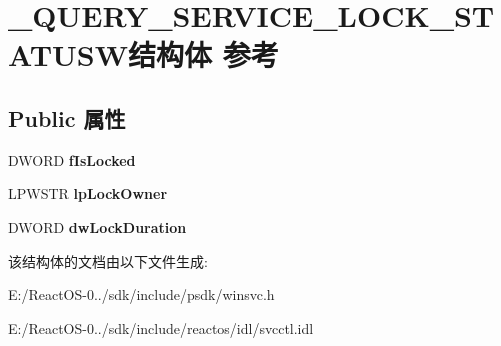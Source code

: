 \hypertarget{struct___q_u_e_r_y___s_e_r_v_i_c_e___l_o_c_k___s_t_a_t_u_s_w}{}\section{\+\_\+\+Q\+U\+E\+R\+Y\+\_\+\+S\+E\+R\+V\+I\+C\+E\+\_\+\+L\+O\+C\+K\+\_\+\+S\+T\+A\+T\+U\+S\+W结构体 参考}
\label{struct___q_u_e_r_y___s_e_r_v_i_c_e___l_o_c_k___s_t_a_t_u_s_w}
\subsection*{Public 属性}
\begin{DoxyCompactItemize}
\item 
\mbox{\label{struct___q_u_e_r_y___s_e_r_v_i_c_e___l_o_c_k___s_t_a_t_u_s_w_aeb8f49d02e77ea3d62c9d1a35a7f58eb}} 
D\+W\+O\+RD {\bfseries f\+Is\+Locked}
\item 
\mbox{\label{struct___q_u_e_r_y___s_e_r_v_i_c_e___l_o_c_k___s_t_a_t_u_s_w_a632a9c186425f62cc1121ed6fd16b89d}} 
L\+P\+W\+S\+TR {\bfseries lp\+Lock\+Owner}
\item 
\mbox{\label{struct___q_u_e_r_y___s_e_r_v_i_c_e___l_o_c_k___s_t_a_t_u_s_w_ab96674bc8d54ca2082a092c575217c5c}} 
D\+W\+O\+RD {\bfseries dw\+Lock\+Duration}
\end{DoxyCompactItemize}


该结构体的文档由以下文件生成\+:\begin{DoxyCompactItemize}
\item 
E\+:/\+React\+O\+S-\/0../sdk/include/psdk/winsvc.\+h\item 
E\+:/\+React\+O\+S-\/0../sdk/include/reactos/idl/svcctl.\+idl\end{DoxyCompactItemize}

